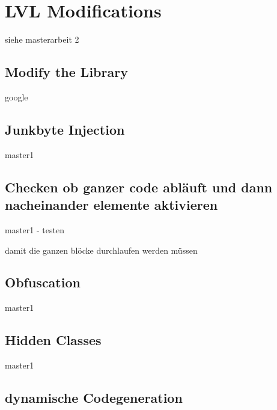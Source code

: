 \section{LVL Modifications}\label{section:lvlModifications}
siehe masterarbeit 2


\subsection{Modify the Library}\label{subsection:basic-}
google

\subsection{Junkbyte Injection}\label{subsection:basic-junkbyte}
master1

\subsection{Checken ob ganzer code abläuft und dann nacheinander elemente aktivieren}\label{subsection:basic-flow}
master1 - testen\newline

damit die ganzen blöcke durchlaufen werden müssen


\subsection{Obfuscation}\label{subsection:basic-obfuscation}
master1

\subsection{Hidden Classes}\label{subsection:basic-hidden}
master1

\subsection{dynamische Codegeneration}\label{subsection:advanced-secure}
